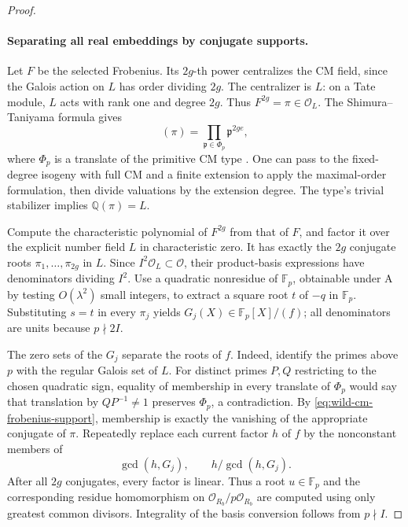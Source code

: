 \documentclass[11pt]{article}
\theoremstyle{definition}
\theoremstyle{remark}
\begin{document}
\begin{proof}
\paragraph{Separating all real embeddings by conjugate supports.}
Let \(F\) be the selected Frobenius. Its \(2g\)-th power
centralizes the CM field, since the Galois action on \(L\)
has order dividing \(2g\). The centralizer is \(L\): on a
Tate module, \(L\) acts with rank one and degree \(2g\).
Thus \(F^{2g}=\pi\in\mathcal O_L\).
The Shimura--Taniyama formula gives
\begin{equation}
                 (\pi)=\prod_{\mathfrak p\in\Phi_p}
                                      \mathfrak p^{2ge},
 \label{eq:wild-cm-frobenius-support}
\end{equation}
where \(\Phi_p\) is a translate of the primitive CM type
\citep[Theorem~8.1 and Corollaries~8.2--8.3, pp.~66--68]{MilneCM2020}.
One can pass to the fixed-degree isogeny with full CM and a
finite extension to apply the maximal-order formulation, then
divide valuations by the extension degree. The type's trivial
stabilizer implies \(\mathbb Q(\pi)=L\).

Compute the characteristic polynomial of \(F^{2g}\) from that
of \(F\), and factor it over the explicit number field \(L\)
in characteristic zero. It has exactly the \(2g\) conjugate
roots \(\pi_1,\ldots,\pi_{2g}\) in \(L\). Since
\(I^2\mathcal O_L\subset\mathcal O\), their product-basis
expressions have denominators dividing \(I^2\).
Use a quadratic nonresidue of \(\mathbb F_p\), obtainable
under \(\mathrm A\) by testing \(O(\lambda^2)\) small integers,
to extract a square root \(t\) of \(-q\) in \(\mathbb F_p\).
Substituting \(s=t\) in every \(\pi_j\) yields
\(G_j(X)\in\mathbb F_p[X]/(f)\); all denominators are units
because \(p\nmid2I\).

The zero sets of the \(G_j\) separate the roots of \(f\).
Indeed, identify the primes above \(p\) with the regular
Galois set of \(L\). For distinct primes \(P,Q\) restricting
to the chosen quadratic sign, equality of membership in every
translate of \(\Phi_p\) would say that translation by
\(QP^{-1}\ne1\) preserves \(\Phi_p\), a contradiction.
By \eqref{eq:wild-cm-frobenius-support}, membership is exactly the vanishing of the appropriate
conjugate of \(\pi\). Repeatedly replace each current factor
\(h\) of \(f\) by the nonconstant members of
\[
                      \gcd(h,G_j),\qquad
                      h/\gcd(h,G_j).
\]
After all \(2g\) conjugates, every factor is linear. Thus a
root \(u\in\mathbb F_p\) and the corresponding residue
homomorphism on \(\mathcal O_{R_b}/p\mathcal O_{R_b}\) are computed using
only greatest common divisors. Integrality of the basis
conversion follows from \(p\nmid I\).


\end{proof}
\end{document}
